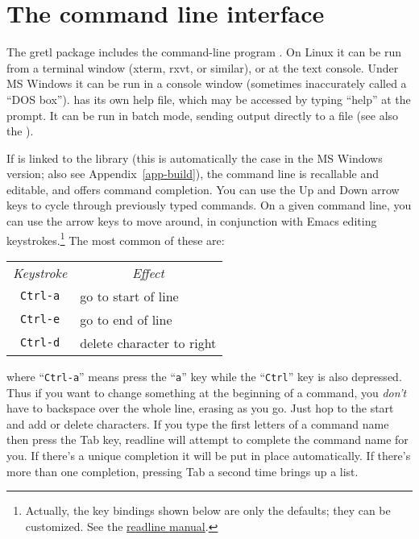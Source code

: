 \chapter{The command line interface}
\label{cli}

The gretl package includes the command-line program .
On Linux it can be run from a terminal window (xterm, rxvt, or
similar), or at the text console.  Under MS Windows it can be run in a
console window (sometimes inaccurately called a ``DOS box'').
 has its own help file, which may be accessed by typing
``help'' at the prompt. It can be run in batch mode, sending output
directly to a file (see also the \GCR).
    
If  is linked to the  library (this is
automatically the case in the MS Windows version; also see
Appendix~\ref{app-build}), the command line is recallable and
editable, and offers command completion.  You can use the Up and Down
arrow keys to cycle through previously typed commands.  On a given
command line, you can use the arrow keys to move around, in
conjunction with Emacs editing keystrokes.\footnote{Actually, the key
  bindings shown below are only the defaults; they can be customized.
  See the
  \href{http://cnswww.cns.cwru.edu/~chet/readline/readline.html}{readline
    manual}.} The most common of these are:
%    
\begin{center}
  \begin{tabular}{cl}
    \textit{Keystroke} & \multicolumn{1}{c}{\textit{Effect}}\\
    \verb+Ctrl-a+ & go to start of line\\
    \verb+Ctrl-e+ & go to end of line\\
    \verb+Ctrl-d+ & delete character to right\\
  \end{tabular}
\end{center}
%
where ``\verb+Ctrl-a+'' means press the ``\verb+a+'' key while the
``\verb+Ctrl+'' key is also depressed.  Thus if you want to change
something at the beginning of a command, you \emph{don't} have to
backspace over the whole line, erasing as you go.  Just hop to the
start and add or delete characters.  If you type the first letters of
a command name then press the Tab key, readline will attempt to
complete the command name for you.  If there's a unique completion it
will be put in place automatically.  If there's more than one
completion, pressing Tab a second time brings up a list.

